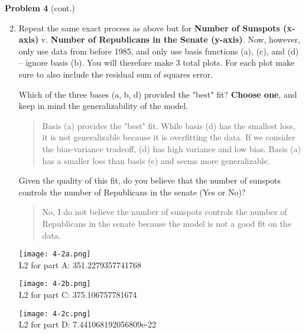 \documentclass[submit]{harvardml}
\begin{document}
\newpage

\begin{framed}
\noindent\textbf{Problem 4} (cont.)\\
\begin{enumerate}
\setcounter{enumi}{1}
\item Repeat the same exact process as above but for \textbf{Number of Sunspots (x-axis)} v. \textbf{Number of Republicans in the Senate (y-axis)}. 
Now, however, only use data from before 1985, and only use basis functions (a), (c), and (d) -- ignore basis (b). You will therefore make 3 total plots. For each plot make sure to also include the residual sum of squares error.

Which of the three bases (a, b, d) provided the "best" fit? \textbf{Choose one}, and keep in mind the generalizability of the model. 
\begin{quote}
    Basis (a) provides the "best" fit. While basis (d) has the smallest loss, it is not generalizable because it is overfitting the data. If we consider the bias-variance tradeoff, (d) has high variance and low bias. Basis (a) has a smaller loss than basis (c) and seems more generalizable.
\end{quote}

Given the quality of this fit, do you believe that the number of sunspots controls the number of Republicans in the senate (Yes or No)?
\begin{quote}
    No, I do not believe the number of sunspots controls the number of Republicans in the senate because the model is not a good fit on the data.
\end{quote}

\begin{center}
    \texttt{[image: 4-2a.png]} 
    \\ L2 for part A: 351.2279357741768
\end{center}
\begin{center}
    \texttt{[image: 4-2b.png]}
    \\ L2 for part C: 375.106757781674
\end{center}
\begin{center}
    \texttt{[image: 4-2c.png]}
    \\ L2 for part D: 7.441068192056809e-22
\end{center}

\end{enumerate}
\end{framed}
\end{document}

